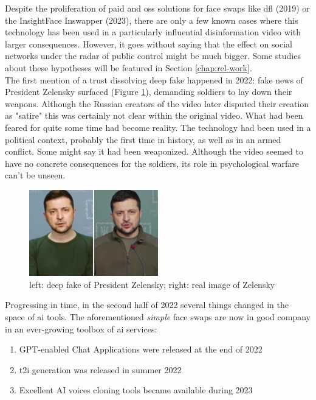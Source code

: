 \documentclass[
  a4paper,  %
  twoside,  %
  bibliography=totoc,
  headsepline,
  cleardoublepage=empty,
  parskip=half,
  draft=false
]{scrbook}
\begin{document}
Despite the proliferation of paid and \gls{oss} solutions for face swaps like \gls{dfl} (2019) or the InsightFace Inswapper (2023), there are only a few known cases where this technology has been used in a particularly influential disinformation video with larger consequences. However, it goes without saying that the effect on social networks under the radar of public control might be much bigger. Some studies about these hypotheses will be featured in Section \ref{chap:rel-work}. \\
The first mention of a trust dissolving deep fake happened in 2022: fake news of President Zelensky surfaced (Figure \ref{fig:zelensky-Deepfake}), demanding soldiers to lay down their weapons. Although the Russian creators of the video later disputed their creation as "satire" this was certainly not clear within the original video. What had been feared for quite some time had become reality. The technology had been used in a political context, probably the first time in history, as well as in an armed conflict. Some might say it had been weaponized. Although the video seemed to have no concrete consequences for the soldiers, its role in psychological warfare can't be unseen.
\begin{figure}[h]
  \centering
  \includegraphics[width=0.5\textwidth]{./graphics/images/Zelensky.jpg}
  \caption{left: deep fake of President Zelensky; right: real image of Zelensky \cite{universityofvirginiaZelenskyySurrenderHoax2022}}
  \label{fig:zelensky-Deepfake}
\end{figure}
Progressing in time, in the second half of 2022 several things changed in the space of \gls{ai} tools. The aforementioned \textit{simple} face swaps are now in good company in an ever-growing toolbox of \gls{ai} services: 
\begin{enumerate}
  \item GPT-enabled Chat Applications were released at the end of 2022
  \item \gls{t2i} generation was released in summer 2022
  \item Excellent AI voices cloning tools became available during 2023
\end{enumerate}
\end{document}

